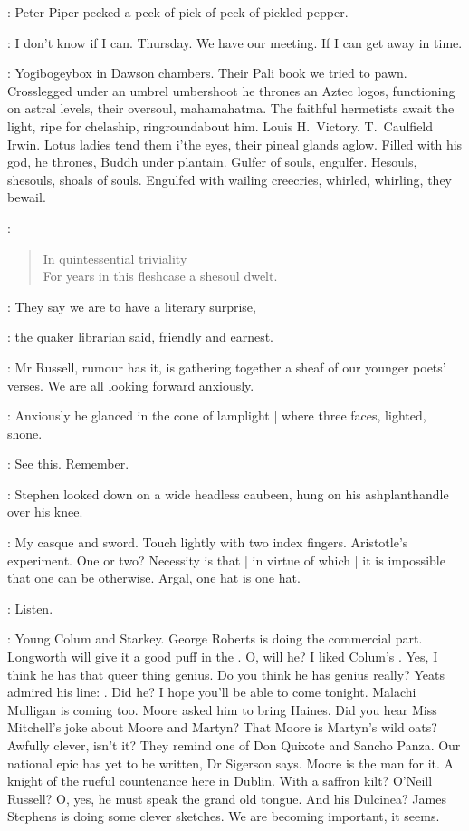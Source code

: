 \StephenInt:
Peter Piper pecked a peck of pick of peck of pickled pepper.

\AErussell:
I don't know if I can.
Thursday.
We have our meeting.
If I can get away in time.

\StephenInt:
Yogibogeybox in Dawson chambers.
Their Pali book we tried to pawn.
Crosslegged under an umbrel umbershoot
he thrones an Aztec logos,
functioning on astral levels,
their oversoul,
mahamahatma.
The faithful hermetists await the light,
ripe for chelaship,
ringroundabout him.
Louis H.~Victory.
T.~Caulfield Irwin.
Lotus ladies tend them i'the eyes,
their pineal glands aglow.
Filled with his god,
he thrones,
Buddh under plantain.
Gulfer of souls, engulfer.
Hesouls, shesouls, shoals of souls.
Engulfed with wailing creecries,
whirled, whirling, they bewail.

\StephenInt:
\begin{verse}
    In quintessential triviality \\
    For years in this fleshcase a shesoul dwelt.
\end{verse}

\librarian:
They say we are to have a literary surprise,

:
the quaker librarian said,
friendly and earnest.

\librarian:
Mr Russell,
rumour has it,
is gathering together a sheaf of our younger poets' verses.
We are all looking forward anxiously.

:
Anxiously he glanced in the cone of lamplight |
where three faces, lighted, shone.

\StephenInt:
See this.
Remember.

:
Stephen looked down on a wide headless caubeen,
hung on his ashplant\-handle over his knee.

\StephenInt:
My casque and sword.
Touch lightly with two index fingers.
Aristotle's experiment.
One or two?
Necessity is that |
in virtue of which |
it is impossible that one can be otherwise.
Argal,
one hat is one hat.

\StephenInt:
Listen.

\AErussell:
Young Colum and Starkey.
George Roberts is doing the commercial part.
Longworth will give it a good puff in the .
O, will he?
I liked Colum's .
Yes,
I think he has that queer thing genius.
Do you think he has genius really?
Yeats admired his line:
.
Did he?
I hope you'll be able to come tonight.
Malachi Mulligan is coming too.
Moore asked him to bring Haines.
Did you hear Miss Mitchell's joke about Moore and Martyn?
That Moore is Martyn's wild oats?
Awfully clever,
isn't it?
They remind one of Don Quixote and Sancho Panza.
Our national epic has yet to be written,
Dr Sigerson says.
Moore is the man for it.
A knight of the rueful countenance here in Dublin.
With a saffron kilt?
O'Neill Russell?
O, yes,
he must speak the grand old tongue.
And his Dulcinea?
James Stephens is doing some clever sketches.
We are becoming important,
it seems.

